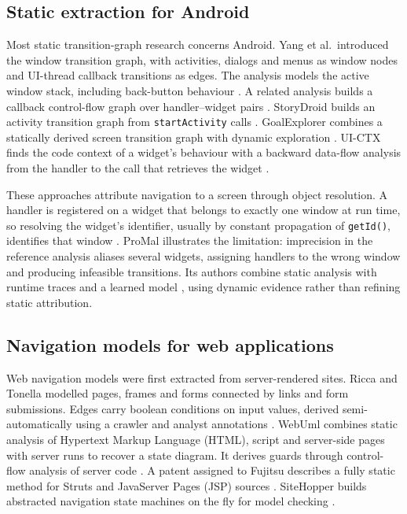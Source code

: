 \subsection{Static extraction for Android}
\label{sec:android}

Most static transition-graph research concerns Android. Yang et al.\ introduced the window
transition graph, with activities, dialogs and menus as window nodes and UI-thread
callback transitions as edges. The analysis models the active window stack, including back-button
behaviour \cite{yang2015wtg,yang2018wtg}. A related analysis builds a callback control-flow
graph over handler--widget pairs \cite{yang2015callbacks}.
StoryDroid builds an activity transition graph from \texttt{startActivity} calls \cite{storydroid2019}. GoalExplorer combines a statically derived screen
transition graph with dynamic exploration \cite{goalexplorer2019}. UI-CTX finds the code context of a widget's behaviour
with a backward data-flow analysis from the handler to the call that retrieves the widget \cite{uictx2025}.

These approaches attribute navigation to a screen through object resolution. A handler is
registered on a widget that belongs to exactly one window at run time, so resolving the
widget's identifier, usually by constant propagation of \texttt{getId()}, identifies that window
\cite{yang2015callbacks}. ProMal illustrates the limitation: imprecision in the reference
analysis aliases several widgets, assigning handlers to the wrong window and producing
infeasible transitions. Its authors combine static analysis with runtime traces and a
learned model \cite{promal2022}, using dynamic evidence rather than refining static attribution.

\subsection{Navigation models for web applications}
\label{sec:webmodels}

Web navigation models were first extracted from server-rendered sites. Ricca and Tonella
modelled pages, frames and forms connected by links and form submissions. Edges carry boolean
conditions on input values, derived semi-automatically using a crawler and analyst annotations
\cite{riccatonella2001}. WebUml combines static analysis of Hypertext Markup Language (HTML),
script and server-side pages with server runs to recover a state diagram. It derives guards
through control-flow analysis of server code
\cite{webuml2004}. A patent assigned to Fujitsu describes a fully static method
for Struts and JavaServer Pages (JSP) sources \cite{tkachuk2013patent}. SiteHopper builds abstracted
navigation state machines on the fly for model checking \cite{sitehopper2013}.

